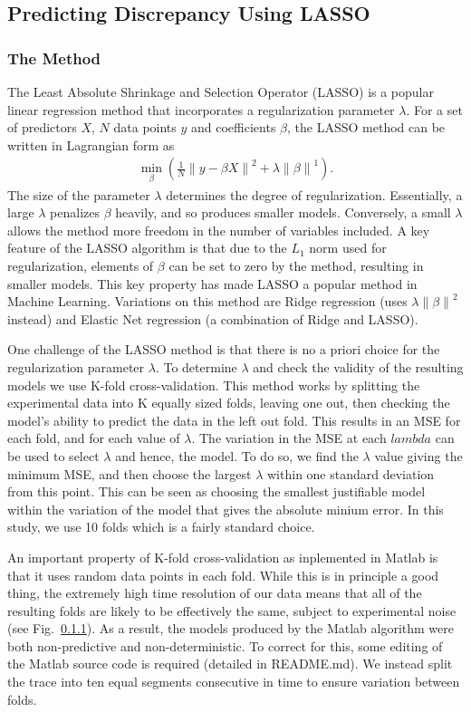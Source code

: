 \documentclass[11pt,a4paper,oneside]{article}
\newcommand{\norm}[1]{\left\lVert#1\right\rVert}
\begin{document}
\subsection{Predicting Discrepancy Using LASSO}\label{SubSec_Lasso_Discrepancy}

\subsubsection{The Method}
The Least Absolute Shrinkage and Selection Operator (LASSO) is a popular linear regression method that incorporates a regularization parameter $\lambda$. For a set of predictors $X$, $N$ data points $y$ and coefficients $\beta$, the LASSO method can be written in Lagrangian form as
\begin{align}
	\min_{\beta} ( \frac{1}{N} \norm{ y - \beta X }^2 + \lambda \norm{ \beta }^1 ).
\end{align}
The size of the parameter $\lambda$ determines the degree of regularization. Essentially, a large $\lambda$ penalizes $\beta$ heavily, and so produces smaller models. Conversely, a small $\lambda$ allows the method more freedom in the number of variables included. A key feature of the LASSO algorithm is that due to the $L_1$ norm used for regularization, elements of $\beta$ can be set to zero by the method, resulting in smaller models. This key property has made LASSO a popular method in Machine Learning. Variations on this method are Ridge regression (uses $\lambda \norm{ \beta }^2$ instead) and Elastic Net regression (a combination of Ridge and LASSO).

One challenge of the LASSO method is that there is no a priori choice for the regularization parameter $\lambda$. To determine $\lambda$ and check the validity of the resulting models we use K-fold cross-validation. This method works by splitting the experimental data into K equally sized folds, leaving one out, then checking the model's ability to predict the data in the left out fold. This results in an MSE for each fold, and for each value of $\lambda$. The variation in the MSE at each $lambda$ can be used to select $\lambda$ and hence, the model. To do so, we find the $\lambda$ value giving the minimum MSE, and then choose the largest $\lambda$ within one standard deviation from this point. This can be seen as choosing the smallest justifiable  model within the variation of the model that gives the absolute minium error. In this study, we use 10 folds which is a fairly standard choice.

An important property of K-fold cross-validation as inplemented in Matlab is that it uses random data points in each fold. While this is in principle a good thing, the extremely high time resolution of our data means that all of the resulting folds are likely to  be effectively the same, subject to experimental noise (see Fig.~\ref{}). As a result, the models produced by the Matlab algorithm were both non-predictive and non-deterministic. To correct for this, some editing of the Matlab source code is required (detailed in README.md). We instead split the trace into ten equal segments consecutive in time to ensure variation between folds.
\end{document}
